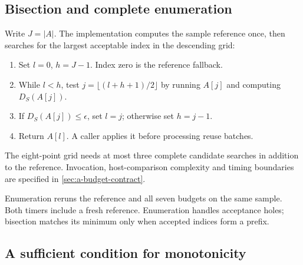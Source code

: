 \subsection{Bisection and complete enumeration}

Write $J=|A|$. The implementation computes the sample reference once,
then searches for the largest acceptable index in the descending grid:
\par\noindent\begin{minipage}{\linewidth}
\begin{enumerate}[leftmargin=*,itemsep=0.15em]
\item Set $l=0$, $h=J-1$. Index zero is the reference fallback.
\item While $l<h$, test $j=\lfloor(l+h+1)/2\rfloor$ by running
$A[j]$ and computing $D_S(A[j])$.
\item If $D_S(A[j])\leq\epsilon$, set $l=j$; otherwise set $h=j-1$.
\item Return $A[l]$. A caller applies it before processing reuse batches.
\end{enumerate}
\end{minipage}\par\medskip
The eight-point grid needs at most three complete candidate searches
in addition to the reference. Invocation, host-comparison complexity and
timing boundaries are specified in \cref{sec:a-budget-contract}.

Enumeration reruns the reference and all seven budgets on the same sample. Both timers include a fresh reference. Enumeration handles acceptance holes; bisection matches its minimum only when accepted indices form a prefix.

\subsection{A sufficient condition for monotonicity}

